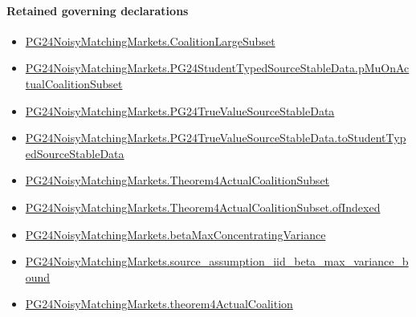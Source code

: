 \documentclass[10pt]{article}
\begin{document}
\paragraph{Retained governing declarations}
\begin{itemize}\raggedright
\item \hyperlink{governing-declaration-4fa0e2b6f69e9db8}{PG24\allowbreak{}Noisy\allowbreak{}Matching\allowbreak{}Markets.\allowbreak{}Coalition\allowbreak{}Large\allowbreak{}Subset}
\item \hyperlink{governing-declaration-b9aef4c916fb025c}{PG24\allowbreak{}Noisy\allowbreak{}Matching\allowbreak{}Markets.\allowbreak{}PG24\allowbreak{}Student\allowbreak{}Typed\allowbreak{}Source\allowbreak{}Stable\allowbreak{}Data.\allowbreak{}p\allowbreak{}Mu\allowbreak{}On\allowbreak{}Actual\allowbreak{}Coalition\allowbreak{}Subset}
\item \hyperlink{governing-declaration-85595fc482827ece}{PG24\allowbreak{}Noisy\allowbreak{}Matching\allowbreak{}Markets.\allowbreak{}PG24\allowbreak{}True\allowbreak{}Value\allowbreak{}Source\allowbreak{}Stable\allowbreak{}Data}
\item \hyperlink{governing-declaration-a357f95266a221c0}{PG24\allowbreak{}Noisy\allowbreak{}Matching\allowbreak{}Markets.\allowbreak{}PG24\allowbreak{}True\allowbreak{}Value\allowbreak{}Source\allowbreak{}Stable\allowbreak{}Data.\allowbreak{}to\allowbreak{}Student\allowbreak{}Typed\allowbreak{}Source\allowbreak{}Stable\allowbreak{}Data}
\item \hyperlink{governing-declaration-f6cea2e13de849c3}{PG24\allowbreak{}Noisy\allowbreak{}Matching\allowbreak{}Markets.\allowbreak{}Theorem4\allowbreak{}Actual\allowbreak{}Coalition\allowbreak{}Subset}
\item \hyperlink{governing-declaration-b9048f3e97a4d849}{PG24\allowbreak{}Noisy\allowbreak{}Matching\allowbreak{}Markets.\allowbreak{}Theorem4\allowbreak{}Actual\allowbreak{}Coalition\allowbreak{}Subset.\allowbreak{}of\allowbreak{}Indexed}
\item \hyperlink{governing-declaration-322e8322d17fd70c}{PG24\allowbreak{}Noisy\allowbreak{}Matching\allowbreak{}Markets.\allowbreak{}beta\allowbreak{}Max\allowbreak{}Concentrating\allowbreak{}Variance}
\item \hyperlink{governing-declaration-106a735d10bd3342}{PG24\allowbreak{}Noisy\allowbreak{}Matching\allowbreak{}Markets.\allowbreak{}source\_\allowbreak{}assumption\_\allowbreak{}iid\_\allowbreak{}beta\_\allowbreak{}max\_\allowbreak{}variance\_\allowbreak{}bound}
\item \hyperlink{governing-declaration-07853e87a88917a1}{PG24\allowbreak{}Noisy\allowbreak{}Matching\allowbreak{}Markets.\allowbreak{}theorem4\allowbreak{}Actual\allowbreak{}Coalition}
\end{itemize}
\end{document}
